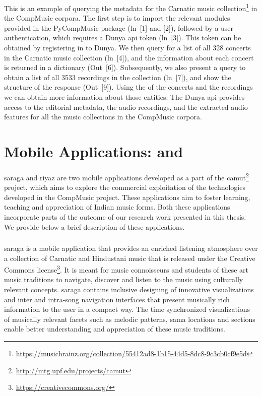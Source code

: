 This is an example of querying the metadata for the Carnatic music collection\footnote{\url{https://musicbrainz.org/collection/55412ad8-1b15-44d5-8dc8-9c3cb0cf9e5d}} in the CompMusic corpora. The first step is to import the relevant modules provided in the PyCompMusic package (ln~[1] and [2]), followed by a user authentication, which requires a Dunya \acrshort{api} token (ln~[3]). This token can be obtained by registering in to Dunya. We then query for a list of all 328 concerts in the Carnatic music collection (ln~[4]), and the information about each concert is returned in a dictionary (Out~[6]). Subsequently, we also present a query to obtain a list of all 3533 recordings in the collection (ln~[7]), and show the structure of the response (Out~[9]). Using the  of the concerts and the recordings we can obtain more information about those entities. The Dunya \acrshort{api} provides access to the editorial metadata, the audio recordings, and the extracted audio features for all the music collections in the CompMusic corpora.

\section{Mobile Applications:  and }
\label{sec:mobile_apps_camut}

\gls{saraga} and \gls{riyaz} are two mobile applications developed as a part of the \gls{camut}\footnote{\url{http://mtg.upf.edu/projects/camut}} project, which aims to explore the commercial exploitation of the technologies developed in the CompMusic project. These applications aim to foster learning, teaching and appreciation of Indian music forms. Both these applications incorporate parts of the outcome of our research work presented in this thesis. We provide below a brief description of these applications. 

\subsubsection{}
\label{sec:saraga}

\Gls{saraga} is a mobile application that provides an enriched listening atmosphere over a collection of Carnatic and Hindustani music that is released under the Creative Commons license\footnote{\url{https://creativecommons.org/}}. It is meant for music connoisseurs and students of these art music traditions to navigate, discover and listen to the music using culturally relevant concepts. \gls{saraga} contains inclusive designing of innovative visualizations and inter and intra-song navigation interfaces that present musically rich information to the user in a compact way. The time synchronized visualizations of musically relevant facets such as melodic patterns, \gls{sama} locations and sections enable better understanding and appreciation of these music traditions.

